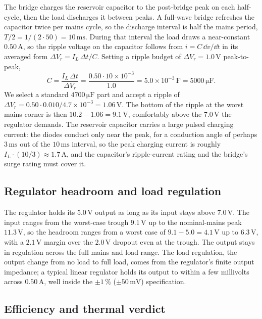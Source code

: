The bridge charges the reservoir capacitor to the post-bridge peak on
each half-cycle, then the load discharges it between peaks. A full-wave
bridge refreshes the capacitor twice per mains cycle, so the discharge
interval is half the mains period, $T/2 = 1/(2\cdot 50) = 10\,\si{\milli
\second}$. During that interval the load draws a near-constant
$0.50\,\si{\ampere}$, so the ripple voltage on the capacitor follows
from $i = C\,\dd v/\dd t$ in its averaged form $\Delta V_{r} = I_{L}\,
\Delta t/C$. Setting a ripple budget of $\Delta V_{r} = 1.0\,\si{\volt}$
peak-to-peak,
\[
C = \frac{I_{L}\,\Delta t}{\Delta V_{r}} = \frac{0.50\cdot 10\times
10^{-3}}{1.0} = 5.0\times 10^{-3}\,\si{\farad} = 5000\,\si{\micro\farad}.
\]
We select a standard $4700\,\si{\micro\farad}$ part and accept a ripple
of $\Delta V_{r} = 0.50\cdot 0.010/4.7\times 10^{-3} = 1.06\,\si{\volt}$.
The bottom of the ripple at the worst mains corner is then $10.2 - 1.06
= 9.1\,\si{\volt}$, comfortably above the $7.0\,\si{\volt}$ the regulator
demands. The reservoir capacitor carries a large pulsed charging
current: the diodes conduct only near the peak, for a conduction angle
of perhaps $3\,\si{\milli\second}$ out of the $10\,\si{\milli\second}$
interval, so the peak charging current is roughly $I_{L}\cdot(10/3)
\approx 1.7\,\si{\ampere}$, and the capacitor's ripple-current rating
and the bridge's surge rating must cover it.

\subsection{Regulator headroom and load regulation}

The regulator holds its $5.0\,\si{\volt}$ output as long as its input
stays above $7.0\,\si{\volt}$. The input ranges from the worst-case
trough $9.1\,\si{\volt}$ up to the nominal-mains peak $11.3\,\si{\volt}$,
so the headroom ranges from a worst case of $9.1 - 5.0 = 4.1\,\si{\volt}$
up to $6.3\,\si{\volt}$, with a $2.1\,\si{\volt}$ margin over the
$2.0\,\si{\volt}$ dropout even at the trough. The output stays in
regulation across the full mains and load range. The load regulation,
the output change from no load to full load, comes from the regulator's
finite output impedance; a typical linear regulator holds its output to
within a few millivolts across $0.50\,\si{\ampere}$, well inside the
$\pm 1\,\%$ ($\pm 50\,\si{\milli\volt}$) specification.

\subsection{Efficiency and thermal verdict}

